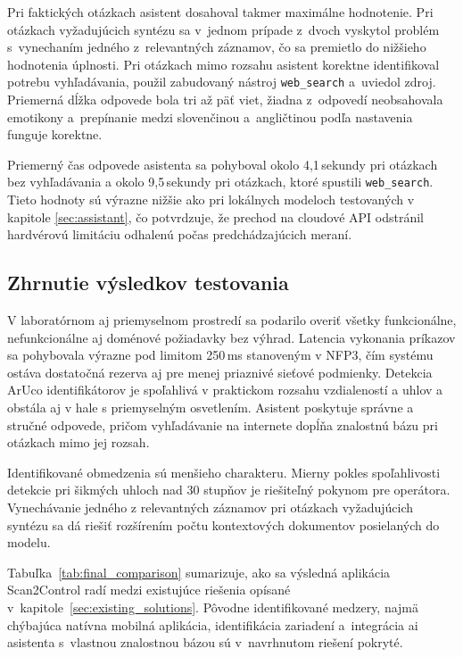Pri faktických otázkach asistent dosahoval takmer maximálne hodnotenie.
Pri otázkach vyžadujúcich syntézu sa v~jednom prípade z~dvoch vyskytol
problém s~vynechaním jedného z~relevantných záznamov, čo sa premietlo do
nižšieho hodnotenia úplnosti. Pri otázkach mimo rozsahu asistent korektne
identifikoval potrebu vyhľadávania, použil zabudovaný nástroj
\texttt{web\_search} a~uviedol zdroj. Priemerná dĺžka odpovede bola tri
až päť viet, žiadna z~odpovedí neobsahovala emotikony a~prepínanie medzi
slovenčinou a~angličtinou podľa nastavenia funguje korektne.

Priemerný čas odpovede asistenta sa pohyboval okolo 4{,}1\,sekundy pri otázkach bez vyhľadávania a okolo 9{,}5\,sekundy pri otázkach, ktoré spustili \texttt{web\_search}. Tieto hodnoty sú výrazne nižšie ako pri lokálnych modeloch testovaných v kapitole \ref{sec:assistant}, čo potvrdzuje, že prechod na cloudové API odstránil hardvérovú limitáciu odhalenú počas predchádzajúcich meraní.

\subsection{Zhrnutie výsledkov testovania}
\label{sec:test-zhrnutie}

V laboratórnom aj priemyselnom prostredí sa podarilo overiť všetky funkcionálne, nefunkcionálne aj doménové požiadavky bez výhrad. Latencia vykonania príkazov sa pohybovala výrazne pod limitom 250\,ms stanoveným v NFP3, čím systému ostáva dostatočná rezerva aj pre menej priaznivé sieťové podmienky. Detekcia ArUco identifikátorov je spoľahlivá v praktickom rozsahu vzdialeností a uhlov a obstála aj v hale s priemyselným osvetlením. Asistent poskytuje správne a stručné odpovede, pričom vyhľadávanie na internete dopĺňa znalostnú bázu pri otázkach mimo jej rozsah.

Identifikované obmedzenia sú menšieho charakteru. Mierny pokles spoľahlivosti detekcie pri šikmých uhloch nad 30 stupňov je riešiteľný pokynom pre operátora. Vynechávanie jedného z relevantných záznamov pri otázkach vyžadujúcich syntézu sa dá riešiť rozšírením počtu kontextových dokumentov posielaných do modelu.

Tabuľka~\ref{tab:final_comparison} sumarizuje, ako sa výsledná aplikácia
Scan2Control radí medzi existujúce riešenia opísané v~kapitole~\ref{sec:existing_solutions}.
Pôvodne identifikované medzery, najmä chýbajúca natívna mobilná aplikácia,
identifikácia zariadení a~integrácia \acrshort{ai} asistenta s~vlastnou
znalostnou bázou sú v~navrhnutom riešení pokryté.


